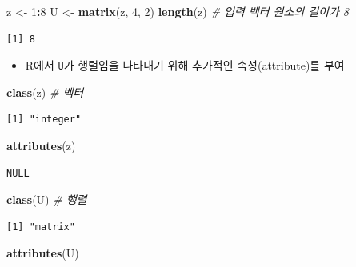 \documentclass[
  11pt,
]{krantz}
\newenvironment{Shaded}{\begin{snugshade}}{\end{snugshade}}
\newcommand{\CommentTok}[1]{\textcolor[rgb]{0.37,0.37,0.37}{\textit{#1}}}
\newcommand{\DecValTok}[1]{\textcolor[rgb]{0.06,0.06,0.06}{#1}}
\newcommand{\KeywordTok}[1]{\textcolor[rgb]{0.27,0.27,0.27}{\textbf{#1}}}
\newcommand{\NormalTok}[1]{#1}
\newcommand{\OperatorTok}[1]{\textcolor[rgb]{0.43,0.43,0.43}{\textbf{#1}}}
\newcommand{\StringTok}[1]{\textcolor[rgb]{0.5,0.5,0.5}{#1}}
\providecommand{\tightlist}{%
  \setlength{\itemsep}{0pt}\setlength{\parskip}{0pt}}
\begin{document}
\footnotesize

\begin{Shaded}
\begin{Highlighting}[]
\NormalTok{z <-}\StringTok{ }\DecValTok{1}\OperatorTok{:}\DecValTok{8}
\NormalTok{U <-}\StringTok{ }\KeywordTok{matrix}\NormalTok{(z, }\DecValTok{4}\NormalTok{, }\DecValTok{2}\NormalTok{)}
\KeywordTok{length}\NormalTok{(z) }\CommentTok{# 입력 벡터 원소의 길이가 8}
\end{Highlighting}
\end{Shaded}

\begin{verbatim}
[1] 8
\end{verbatim}

\normalsize

\begin{itemize}
\tightlist
\item
  R에서 \texttt{U}가 행렬임을 나타내기 위해 추가적인 속성(attribute)를 부여
\end{itemize}

\footnotesize

\begin{Shaded}
\begin{Highlighting}[]
\KeywordTok{class}\NormalTok{(z) }\CommentTok{# 벡터}
\end{Highlighting}
\end{Shaded}

\begin{verbatim}
[1] "integer"
\end{verbatim}

\begin{Shaded}
\begin{Highlighting}[]
\KeywordTok{attributes}\NormalTok{(z)}
\end{Highlighting}
\end{Shaded}

\begin{verbatim}
NULL
\end{verbatim}

\begin{Shaded}
\begin{Highlighting}[]
\KeywordTok{class}\NormalTok{(U) }\CommentTok{# 행렬}
\end{Highlighting}
\end{Shaded}

\begin{verbatim}
[1] "matrix"
\end{verbatim}

\begin{Shaded}
\begin{Highlighting}[]
\KeywordTok{attributes}\NormalTok{(U)}
\end{Highlighting}
\end{Shaded}
\end{document}

